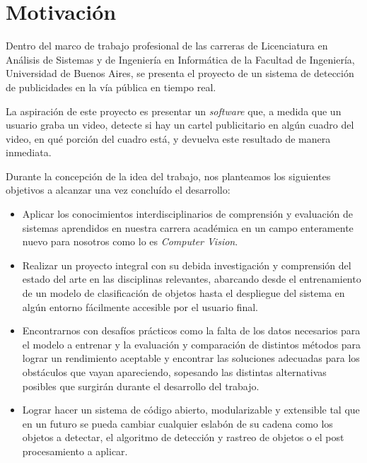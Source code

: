 \documentclass[a4paper]{article}
\begin{document}
\tableofcontents
\newpage

\section{Motivación}

Dentro del marco de trabajo profesional de las carreras de Licenciatura en Análisis de Sistemas y de Ingeniería en Informática de la Facultad de Ingeniería, Universidad de Buenos Aires, se presenta el proyecto de un sistema de detección de publicidades en la vía pública en tiempo real.

La aspiración de este proyecto es presentar un \textit{software} que, a medida que un usuario graba un video, detecte si hay un cartel publicitario en algún cuadro del video, en qué porción del cuadro está, y devuelva este resultado de manera inmediata.

Durante la concepción de la idea del trabajo, nos planteamos los siguientes objetivos a alcanzar una vez concluído el desarrollo:

\begin{itemize}
    \item Aplicar los conocimientos interdisciplinarios de comprensión y evaluación de sistemas aprendidos en nuestra carrera académica en un campo enteramente nuevo para nosotros como lo es \textit{Computer Vision}.

    \item Realizar un proyecto integral con su debida investigación y comprensión del estado del arte en las disciplinas relevantes, abarcando desde el entrenamiento de un modelo de clasificación de objetos hasta el despliegue del sistema en algún entorno fácilmente accesible por el usuario final.

    \item Encontrarnos con desafíos prácticos como la falta de los datos necesarios para el modelo a entrenar y la evaluación y comparación de distintos métodos para lograr un rendimiento aceptable y encontrar las soluciones adecuadas para los obstáculos que vayan apareciendo, sopesando las distintas alternativas posibles que surgirán durante el desarrollo del trabajo.

    \item Lograr hacer un sistema de código abierto, modularizable y extensible tal que en un futuro se pueda cambiar cualquier eslabón de su cadena como los objetos a detectar, el algoritmo de detección y rastreo de objetos o el post procesamiento a aplicar.
\end{itemize}
\end{document}
